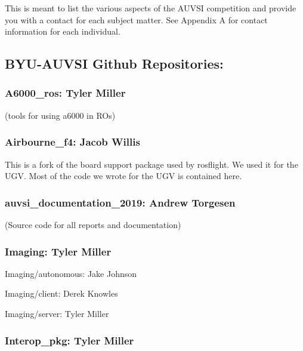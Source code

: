 {This is meant to list the various aspects of the AUVSI competition and
provide you with a contact for each subject matter. See Appendix A for
contact information for each individual. }

\hypertarget{h.fzoo3toav61z}{\subsection{\texorpdfstring{{BYU-AUVSI
Github
Repositories:}}{BYU-AUVSI Github Repositories:}}\label{h.fzoo3toav61z}}

\hypertarget{h.ez5i7wokvzkz}{\subsubsection{\texorpdfstring{{A6000\_ros:
Tyler Miller}}{A6000\_ros: Tyler Miller}}\label{h.ez5i7wokvzkz}}

{(tools for using a6000 in ROs)}

\hypertarget{h.40v6z6uc89r7}{\subsubsection{\texorpdfstring{{Airbourne\_f4:
Jacob Willis}}{Airbourne\_f4: Jacob Willis}}\label{h.40v6z6uc89r7}}

{This is a fork of the board support package used by rosflight. We used
it for the UGV. Most of the code we wrote for the UGV is contained
here.}

\hypertarget{h.smcq1h7rkxh}{\subsubsection{\texorpdfstring{{auvsi\_documentation\_2019:
Andrew
Torgesen}}{auvsi\_documentation\_2019: Andrew Torgesen}}\label{h.smcq1h7rkxh}}

{(Source code for all reports and documentation)}

\hypertarget{h.mabru5lpfx9n}{\subsubsection{\texorpdfstring{{Imaging:
Tyler Miller}}{Imaging: Tyler Miller}}\label{h.mabru5lpfx9n}}

{Imaging/autonomous: Jake Johnson}

{Imaging/client: Derek Knowles}

{Imaging/server: Tyler Miller~~~~~~~~}

\hypertarget{h.n49nu7bx5vod}{\subsubsection{\texorpdfstring{{Interop\_pkg:
Tyler Miller}}{Interop\_pkg: Tyler Miller}}\label{h.n49nu7bx5vod}}


